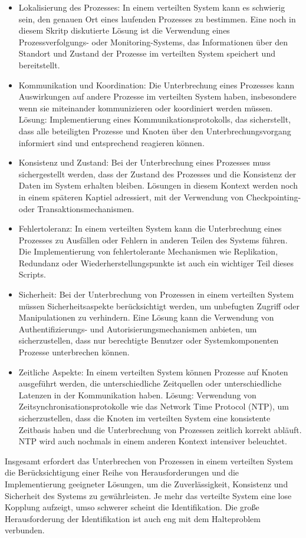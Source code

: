 \documentclass[../vs-script-first-v01.tex]{subfiles}
\begin{document}
\begin{itemize}
\item Lokalisierung des Prozesses: In einem verteilten System kann es schwierig sein, den genauen Ort eines laufenden Prozesses zu bestimmen. Eine noch in diesem Skritp diskutierte Lösung ist die Verwendung eines Prozessverfolgungs- oder Monitoring-Systems, das Informationen über den Standort und Zustand der Prozesse im verteilten System speichert und bereitstellt.
\item Kommunikation und Koordination: Die Unterbrechung eines Prozesses kann Auswirkungen auf andere Prozesse im verteilten System haben, insbesondere wenn sie miteinander kommunizieren oder koordiniert werden müssen. Lösung: Implementierung eines Kommunikationsprotokolls, das sicherstellt, dass alle beteiligten Prozesse und Knoten über den Unterbrechungsvorgang informiert sind und entsprechend reagieren können.
\item Konsistenz und Zustand: Bei der Unterbrechung eines Prozesses muss sichergestellt werden, dass der Zustand des Prozesses und die Konsistenz der Daten im System erhalten bleiben. Lösungen in diesem Kontext werden noch in einem späteren Kaptiel adressiert, mit der  Verwendung von Checkpointing- oder Transaktionsmechanismen.
\item Fehlertoleranz: In einem verteilten System kann die Unterbrechung eines Prozesses zu Ausfällen oder Fehlern in anderen Teilen des Systems führen. Die Implementierung von fehlertolerante Mechanismen wie Replikation, Redundanz oder Wiederherstellungspunkte ist auch ein wichtiger Teil dieses Scripts.
\item Sicherheit: Bei der Unterbrechung von Prozessen in einem verteilten System müssen Sicherheitsaspekte berücksichtigt werden, um unbefugten Zugriff oder Manipulationen zu verhindern. Eine Lösung kann die Verwendung von Authentifizierungs- und Autorisierungsmechanismen anbieten, um sicherzustellen, dass nur berechtigte Benutzer oder Systemkomponenten Prozesse unterbrechen können.
\item Zeitliche Aspekte: In einem verteilten System können Prozesse auf Knoten ausgeführt werden, die unterschiedliche Zeitquellen oder unterschiedliche Latenzen in der Kommunikation haben. Lösung: Verwendung von Zeitsynchronisationsprotokolle wie das Network Time Protocol (NTP), um sicherzustellen, dass die Knoten im verteilten System eine konsistente Zeitbasis haben und die Unterbrechung von Prozessen zeitlich korrekt abläuft. NTP wird auch nochmals in einem anderen Kontext intensiver beleuchtet.
\end{itemize}
Insgesamt erfordert das Unterbrechen von Prozessen in einem verteilten System die Berücksichtigung einer Reihe von Herausforderungen und die Implementierung geeigneter Lösungen, um die Zuverlässigkeit, Konsistenz und Sicherheit des Systems zu gewährleisten. Je mehr das verteilte System eine lose Kopplung aufzeigt, umso schwerer scheint die Identifikation. Die große Herausforderung der Identifikation ist auch eng mit dem Halteproblem verbunden.
\end{document}
